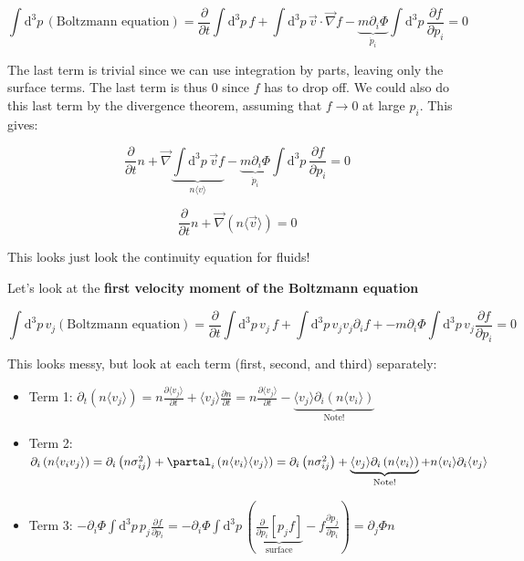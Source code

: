 \documentclass{article}
\newcommand{\be}{\begin{equation}}
\newcommand{\ee}{\end{equation}}
\begin{document}
\be
\int \mathrm{d}^3 p \, \left(\text{Boltzmann equation}\right) = \frac{\partial}{\partial t}\int \mathrm{d}^3 p \, f + \int \mathrm{d}^3 p \, \vec{v}\cdot \vec{\nabla} f - \underbrace{m \partial_i \Phi}_{\dot{p}_i} \int \mathrm{d}^3 p \, \frac{\partial f}{\partial p_i} = 0
\ee

The last term is trivial since we can use integration by parts, leaving only the surface terms. The last term is thus 0 since $f$ has to drop off. We could also do this last term by the divergence theorem, assuming that $f \to 0$ at large $p_i$. This gives:


\be
\frac{\partial}{\partial t}n + \vec{\nabla} \underbrace{\int \mathrm{d}^3 p \, \vec{v} f}_{n\langle v\rangle} - \underbrace{m \partial_i \Phi}_{\dot{p}_i} \int \mathrm{d}^3 p \, \frac{\partial f}{\partial p_i} = 0
\ee

\be
\boxed{\frac{\partial}{\partial t} n + \vec{\nabla} \left(n \langle\vec{v}\rangle\right) = 0 }
\ee

This looks just look the continuity equation for fluids!

Let's look at the \textbf{first velocity moment of the Boltzmann equation}

\be
\int \mathrm{d}^3 p \, v_j \left(\text{Boltzmann equation}\right) = \frac{\partial}{\partial t} \int \mathrm{d}^3 p \, v_j \, f + \int \mathrm{d}^3 p \, v_j v_j \partial_i f + - m \partial_i \Phi \int \mathrm{d}^3 p \, v_j \frac{\partial f}{\partial p_i} = 0
\ee

This looks messy, but look at each term (first, second, and third) separately:

\begin{itemize}
    \item Term 1: $\partial_t \left(n \langle v_j \rangle\right) = n \frac{\partial \langle v_j\rangle}{\partial t} + \langle v_j\rangle \frac{\partial n}{\partial t} = n \frac{\partial \langle v_j\rangle}{\partial t} - \underbrace{\langle v_j \rangle \partial_i \left(n \langle v_i \rangle\right)}_\text{Note!}$
    \item Term 2: $\partial_i \left(n \langle v_i v_j \rangle\right) = \partial_i \left(n\sigma_{ij}^2  \right) + \partal_i \left(n\langle v_i\rangle\langle v_j \rangle\right) = \partial_i \left(n\sigma_{ij}^2  \right) + \underbrace{\langle v_j \rangle \partial_i \left(n \langle v_i \rangle\right)}_\text{Note!} + n \langle v_i \rangle \partial_i \langle v_j \rangle$
    \item Term 3: $-\partial_i \Phi \int \mathrm{d}^3 p \, p_j \frac{\partial f}{\partial p_i} = -\partial_i \Phi \int \mathrm{d}^3 p\, \left(\underbrace{\frac{\partial}{\partial p_i}\left[p_j f\right]}_\text{surface} - f \frac{\partial p_j}{\partial p_i}\right) = \partial_j \Phi n$
\end{itemize}
\end{document}
